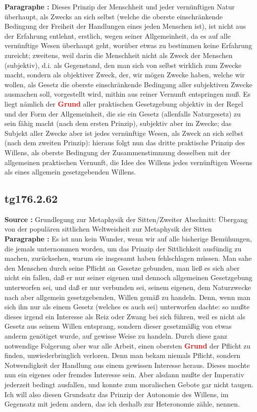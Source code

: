 \documentclass[a4paper,12pt,twoside]{book}
\newcommand{\match}[1]{\textcolor{red}{\textbf{#1}}}
\begin{document}
	\noindent\textbf{Paragraphe : }Dieses Prinzip der Menschheit und jeder vernünftigen Natur überhaupt, als Zwecks an sich selbst (welche die oberste einschränkende Bedingung der Freiheit der Handlungen eines jeden Menschen ist), ist nicht aus der Erfahrung entlehnt, erstlich, wegen seiner Allgemeinheit, da es auf alle vernünftige Wesen überhaupt geht, worüber etwas zu bestimmen keine Erfahrung zureicht; zweitens, weil darin die Menschheit nicht als Zweck der Menschen (subjektiv), d.i. als Gegenstand, den man sich von selbst wirklich zum Zwecke macht, sondern als objektiver Zweck, der, wir mögen Zwecke haben, welche wir wollen, als Gesetz die oberste einschränkende Bedingung aller subjektiven Zwecke ausmachen soll, vorgestellt wird, mithin aus reiner Vernunft entspringen muß. Es liegt nämlich der \match{Grund} aller praktischen Gesetzgebung objektiv in der Regel und der Form der Allgemeinheit, die sie ein Gesetz (allenfalls Naturgesetz) zu sein fähig macht (nach dem ersten Prinzip), subjektiv aber im Zwecke; das Subjekt aller Zwecke aber ist jedes vernünftige Wesen, als Zweck an sich selbst (nach dem zweiten Prinzip): hieraus folgt nun das dritte praktische Prinzip des Willens, als oberste Bedingung der Zusammenstimmung desselben mit der allgemeinen praktischen Vernunft, die Idee des Willens jedes vernünftigen Wesens als eines allgemein gesetzgebenden Willens.
	
	
	\subsection*{tg176.2.62} 
	\textbf{Source : }Grundlegung zur Metaphysik der Sitten/Zweiter Abschnitt: Übergang von der populären sittlichen Weltweisheit zur Metaphysik der Sitten\\  
	
	\noindent\textbf{Paragraphe : }Es ist nun kein Wunder, wenn wir auf alle bisherige Bemühungen, die jemals unternommen worden, um das Prinzip der Sittlichkeit ausfündig zu machen, zurücksehen, warum sie insgesamt haben fehlschlagen müssen. Man sahe den Menschen durch seine Pflicht an Gesetze gebunden, man ließ es sich aber nicht ein fallen, daß er nur seiner eigenen und dennoch allgemeinen Gesetzgebung unterworfen sei, und daß er nur verbunden sei, seinem eigenen, dem Naturzwecke nach aber allgemein gesetzgebenden, Willen gemäß zu handeln. Denn, wenn man sich ihn nur als einem Gesetz (welches es auch sei) unterworfen dachte: so mußte dieses irgend ein Interesse als Reiz oder Zwang bei sich führen, weil es nicht als Gesetz aus seinem Willen entsprang, sondern dieser gesetzmäßig von etwas anderm genötiget wurde, auf gewisse Weise zu handeln. Durch diese ganz notwendige Folgerung aber war alle Arbeit, einen obersten \match{Grund} der Pflicht zu finden, unwiederbringlich verloren. Denn man bekam niemals Pflicht, sondern Notwendigkeit der Handlung aus einem gewissen Interesse heraus.  Dieses mochte nun ein eigenes oder fremdes Interesse sein. Aber alsdann mußte der Imperativ jederzeit bedingt ausfallen, und konnte zum moralischen Gebote gar nicht taugen. Ich will also diesen Grundsatz das Prinzip der Autonomie des Willens, im Gegensatz mit jedem andern, das ich deshalb zur Heteronomie zähle, nennen. 
	
\end{document}

